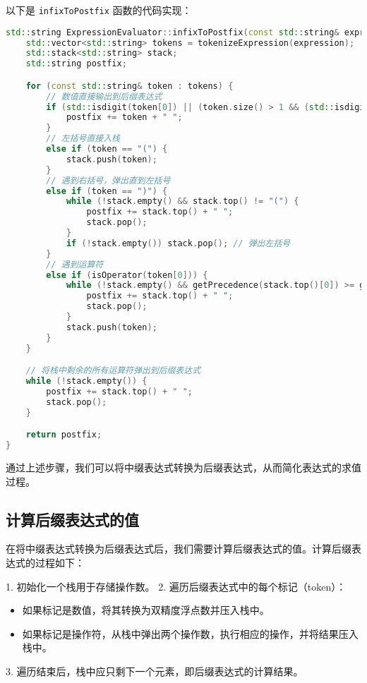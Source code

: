 \documentclass[UTF8]{ctexart}
\begin{document}
以下是 \texttt{infixToPostfix} 函数的代码实现：

\begin{lstlisting}[language=C++, breaklines=true]
std::string ExpressionEvaluator::infixToPostfix(const std::string& expression) {
    std::vector<std::string> tokens = tokenizeExpression(expression);
    std::stack<std::string> stack;
    std::string postfix;

    for (const std::string& token : tokens) {
        // 数值直接输出到后缀表达式
        if (std::isdigit(token[0]) || (token.size() > 1 && (std::isdigit(token[1]) || token[0] == '.'))) {
            postfix += token + " ";
        }
        // 左括号直接入栈
        else if (token == "(") {
            stack.push(token);
        }
        // 遇到右括号，弹出直到左括号
        else if (token == ")") {
            while (!stack.empty() && stack.top() != "(") {
                postfix += stack.top() + " ";
                stack.pop();
            }
            if (!stack.empty()) stack.pop(); // 弹出左括号
        }
        // 遇到运算符
        else if (isOperator(token[0])) {
            while (!stack.empty() && getPrecedence(stack.top()[0]) >= getPrecedence(token[0])) {
                postfix += stack.top() + " ";
                stack.pop();
            }
            stack.push(token);
        }
    }

    // 将栈中剩余的所有运算符弹出到后缀表达式
    while (!stack.empty()) {
        postfix += stack.top() + " ";
        stack.pop();
    }

    return postfix;
}
\end{lstlisting}

通过上述步骤，我们可以将中缀表达式转换为后缀表达式，从而简化表达式的求值过程。

\subsection{计算后缀表达式的值}

在将中缀表达式转换为后缀表达式后，我们需要计算后缀表达式的值。计算后缀表达式的过程如下：

1. 初始化一个栈用于存储操作数。
2. 遍历后缀表达式中的每个标记（token）：
   \begin{itemize}
     \item 如果标记是数值，将其转换为双精度浮点数并压入栈中。
     \item 如果标记是操作符，从栈中弹出两个操作数，执行相应的操作，并将结果压入栈中。
   \end{itemize}
3. 遍历结束后，栈中应只剩下一个元素，即后缀表达式的计算结果。
\end{document}
